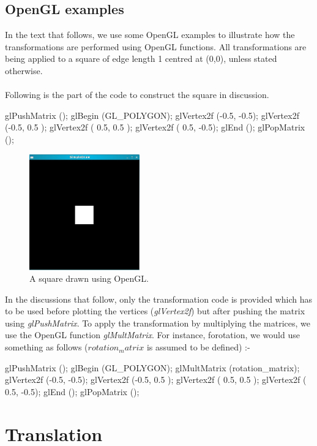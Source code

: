 \documentclass[a4paper,12pt,titlepage,twosided]{article}
\begin{document}
	\subsection{OpenGL examples}
	In the text that follows, we use some OpenGL examples to illustrate how the transformations are performed using OpenGL functions. All transformations are being applied to a square of edge length 1 centred at (0,0), unless stated otherwise. 	
\\
\\
	Following is the part of the code to construct the square in discussion. 
	\begin{code}
		glPushMatrix ();
		glBegin (GL_POLYGON);
		glVertex2f (-0.5, -0.5);
		glVertex2f (-0.5, 0.5 );
		glVertex2f ( 0.5, 0.5 );
		glVertex2f ( 0.5, -0.5);
		glEnd ();
		glPopMatrix ();
	\end{code}
	\begin{figure}[h]
		\centering
		\includegraphics[height=50mm]{Images_final/Square.jpg}
		\caption{A square drawn using OpenGL.}
		\label{fig:simple_square}
	\end{figure}
	In the discussions that follow, only the transformation code is provided which has to be used before plotting the vertices (\emph{glVertex2f}) but after pushing the matrix using \emph{glPushMatrix}. To apply the transformation by multiplying the matrices, we use the OpenGL function \emph{glMultMatrix}. For instance, forotation, we would use something as follows ($rotation_matrix$ is assumed to be defined) :-
	\begin{code}
		glPushMatrix ();
		glBegin (GL_POLYGON);
		glMultMatrix (rotation_matrix);
		glVertex2f (-0.5, -0.5);
		glVertex2f (-0.5, 0.5 );
		glVertex2f ( 0.5, 0.5 );
		glVertex2f ( 0.5, -0.5);
		glEnd ();
		glPopMatrix ();
	\end{code}

		
\pagebreak
\section{Translation}
\end{document}
